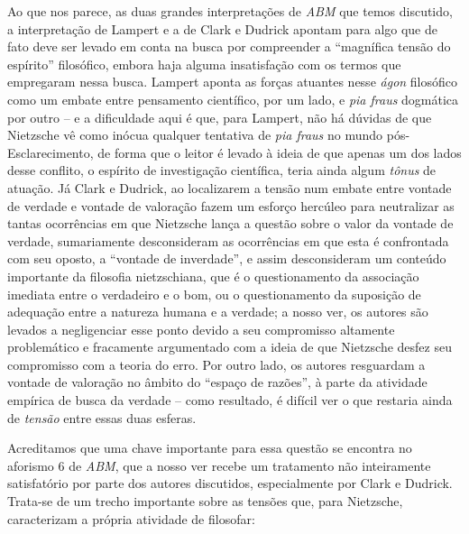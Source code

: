 \documentclass[
	12pt,				%
	openright,			%
	oneside,			%
	a4paper,			%
	english,			%
	french,				%
	spanish,			%
	brazil				%
	]{abntex2}
\begin{document}
Ao que nos parece, as duas grandes interpretações de \textit{ABM} que temos discutido, a interpretação de Lampert e a de Clark e Dudrick apontam para algo que de fato deve ser levado em conta na busca por compreender a “magnífica tensão do espírito” filosófico, embora haja alguma insatisfação com os termos que empregaram nessa busca. Lampert aponta as forças atuantes nesse \textit{ágon} filosófico como um embate entre pensamento científico, por um lado, e \textit{pia fraus} dogmática por outro – e a dificuldade aqui é que, para Lampert, não há dúvidas de que Nietzsche vê como inócua qualquer tentativa de \textit{pia fraus} no mundo pós-Esclarecimento, de forma que o leitor é levado à ideia de que apenas um dos lados desse conflito, o espírito de investigação científica, teria ainda algum \textit{tônus} de atuação. Já Clark e Dudrick, ao localizarem a tensão num embate entre vontade de verdade e vontade de valoração fazem um esforço hercúleo para neutralizar as tantas ocorrências em que Nietzsche lança a questão sobre o valor da vontade de verdade, sumariamente desconsideram as ocorrências em que esta é confrontada com seu oposto, a “vontade de inverdade”, e assim desconsideram um conteúdo importante da filosofia nietzschiana, que é o questionamento da associação imediata entre o verdadeiro e o bom, ou o questionamento da suposição de adequação entre a natureza humana e a verdade; a nosso ver, os autores são levados a negligenciar esse ponto devido a seu compromisso altamente problemático e fracamente argumentado com a ideia de que Nietzsche desfez seu compromisso com a teoria do erro. Por outro lado, os autores resguardam a vontade de valoração no âmbito do “espaço de razões”, à parte da atividade empírica de busca da verdade – como resultado, é difícil ver o que restaria ainda de \textit{tensão} entre essas duas esferas.

	Acreditamos que uma chave importante para essa questão se encontra no aforismo 6 de \textit{ABM}, que a nosso ver recebe um tratamento não inteiramente satisfatório por parte dos autores discutidos, especialmente por Clark e Dudrick. Trata-se de um trecho importante sobre as tensões que, para Nietzsche, caracterizam a própria atividade de filosofar:
\end{document}
